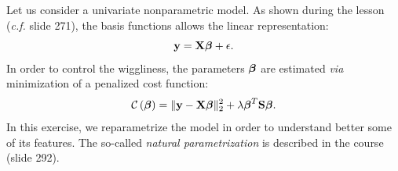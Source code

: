 \documentclass[a4paper,12pt]{article}\usepackage[]{graphicx}\usepackage[]{color}
\def\by{\mathbf{y}}
\def\bbeta{\mbox{\boldmath $\beta$}}
\def\bX{\mathbf{X}}
\def\op{\left(}
\def\cp{\right)}
\begin{document}
Let us consider a univariate nonparametric model. As shown during the lesson (\textit{c.f.} slide 271), the basis functions allows the linear representation:
\begin{equation*}
     \by = \bX \bbeta + \mathbf{\epsilon}.
\end{equation*}
In order to control the wiggliness, the parameters $\bbeta$ are estimated \textit{via} minimization of a penalized cost function:
\begin{equation*}
     \mathcal{C}\op\bbeta\cp = \| \by-\bX\bbeta\|_2^2 + \lambda\bbeta^T \mathbf{S}\bbeta \\.
\end{equation*}
In this exercise, we reparametrize the model in order to understand better some of its features. The so-called \textit{natural parametrization} is described in the course (slide 292).
\end{document}

